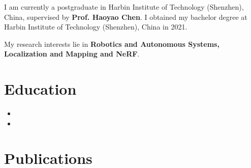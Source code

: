 \documentclass[11pt,a4paper,sans]{moderncv}        %
\begin{document}

\makecvtitle

\small{I am currently a postgraduate in Harbin Institute of Technology (Shenzhen), China, supervised by \textbf{Prof. Haoyao Chen}. I obtained my bachelor degree at Harbin Institute of Technology (Shenzhen), China in 2021.

My research interests lie in \textbf{Robotics and Autonomous Systems, Localization and Mapping and NeRF}. 

\section{Education}

\vspace{5pt}

\begin{itemize}



\item{}

\item{}

\end{itemize}

\vspace{2pt}

\section{Publications}

\vspace{5pt}

}
\end{document}
